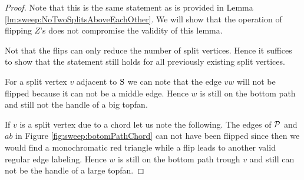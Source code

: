   \begin{proof}
    Note that this is the same statement as is provided in Lemma \ref{lm:sweep:NoTwoSplitsAboveEachOther}. We will show that the operation of flipping $Z$'s does not compromise the validity of this lemma.

    Not that the flips can only reduce the number of split vertices. Hence it suffices to show that the statement still holds for all previously existing split vertices.


    For a split vertex $v$ adjacent to $\pS$ we can note that the edge $vw$ will not be flipped because it can not be a middle edge. Hence $w$ is still on the bottom path and still not the handle of a big topfan.

    If $v$ is a split vertex due to a chord let us note the following.
    The edges of $\P$ and $ab$ in Figure \ref{fig:sweep:botomPathChord} can not have been flipped since then we would find a monochromatic red triangle while a flip leads to another valid regular edge labeling. Hence $w$ is still on the bottom path trough $v$ and still can not be the handle of a large topfan.
  \end{proof}
